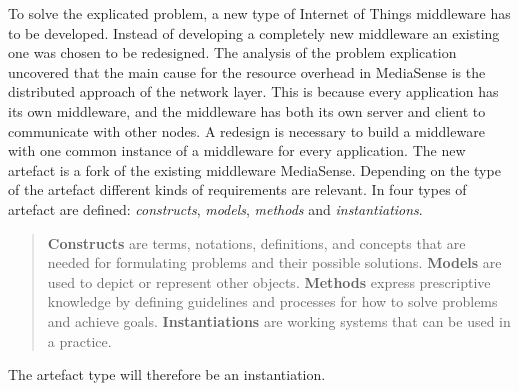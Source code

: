 To solve the explicated problem, a new type of Internet of Things middleware has to be developed. Instead of developing a completely new middleware an existing one was chosen to be redesigned. The analysis of the problem explication uncovered that the main cause for the resource overhead in MediaSense is the distributed approach of the network layer. This is because every application has its own middleware, and the middleware has both its own server and client to communicate with other nodes. A redesign is necessary to build a middleware with one common instance of a middleware for every application. The new artefact is a fork of the existing middleware MediaSense. Depending on the type of the artefact different kinds of requirements are relevant. In \cite{johannesson2012design} four types of artefact are defined: \emph{constructs}, \emph{models}, \emph{methods} and \emph{instantiations}.  

\begin{quotation}
  \textbf{Constructs} are terms, notations, definitions, and concepts that are needed for formulating problems and their possible solutions.
  \textbf{Models} are used to depict or represent other objects.
  \textbf{Methods} express prescriptive knowledge by defining guidelines and processes for how to solve problems and achieve goals.
  \textbf{Instantiations} are working systems that can be used in a practice.
\end{quotation}
The artefact type will therefore be an instantiation.
